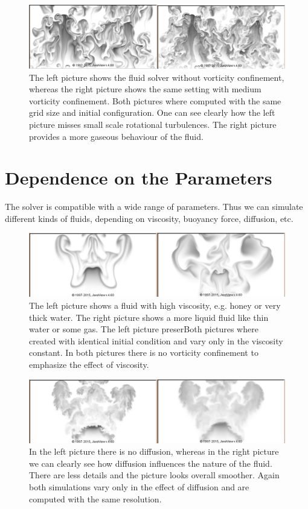 \documentclass[a4paper,10pt,oneside,final,german,openbib,pdftex,titlepage]{scrbook}
\begin{document}
\begin{figure}[H]
 \centering
 \includegraphics[scale=0.30]{Vorticity.png}
 \caption{The left picture shows the fluid solver without vorticity confinement, whereas the right picture shows the same setting with medium vorticity confinement. Both pictures where computed with the same grid size and initial configuration. One can see clearly how the left picture misses small scale rotational turbulences. The right picture provides a more gaseous behaviour of the fluid.}
 \label{VorticityOnOff}
\end{figure}

\section{Dependence on the Parameters}
The solver is compatible with a wide range of parameters. Thus we can simulate different kinds of fluids, depending on viscosity, buoyancy force, diffusion, etc.

\begin{figure}[H]
 \centering
 \includegraphics[scale=0.30]{Viscosity-2.png}
 \caption{The left picture shows a fluid with high viscosity, e.g. honey or very thick water. The right picture shows a more liquid fluid like thin water or some gas. The left picture preserBoth pictures where created with identical initial condition and vary only in the viscosity constant. In both pictures there is no vorticity confinement to emphasize the effect of viscosity.}
 \label{ViscosityOnOff}
\end{figure}

\begin{figure}[H]
 \centering
 \includegraphics[scale=0.30]{Diffusion.png}
 \caption{In the left picture there is no diffusion, whereas in the right picture we can clearly see how diffusion influences the nature of the fluid. There are less details and the picture looks overall smoother. Again both simulations vary only in the effect of diffusion and are computed with the same resolution.}
 \label{ViscosityOnOff}
\end{figure}
\end{document}
